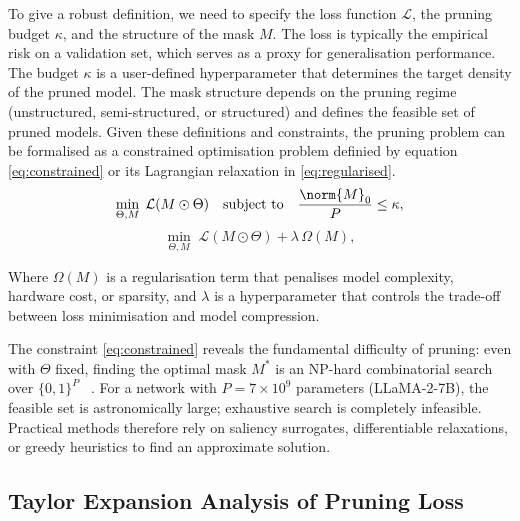 To give a robust definition, we need to specify the loss function $\mathcal{L}$, the pruning budget $\kappa$, and the structure of the mask $M$.  The loss is typically the empirical risk on a validation set, which serves as a proxy for generalisation performance.  The budget $\kappa$ is a user-defined hyperparameter that determines the target density of the pruned model.  The mask structure depends on the pruning regime (unstructured, semi-structured, or structured) and defines the feasible set of pruned models.
Given these definitions and constraints, the pruning problem can be formalised as a constrained optimisation problem definied by equation \eqref{eq:constrained} or its Lagrangian relaxation in \eqref{eq:regularised}.
\begin{equation}
\min_{\Theta, M}\; \mathcal{L}(M \odot \Theta)
\quad
\text{subject to}
\quad
\frac{\norm{M}_0}{P} \le \kappa,
\label{eq:constrained}
\end{equation}
\begin{equation}
\min_{\Theta, M}\; \mathcal{L}(M \odot \Theta) + \lambda\,\Omega(M),
\label{eq:regularised}
\end{equation}

Where $\Omega(M)$ is a regularisation term that penalises model complexity, hardware cost, or sparsity, and $\lambda$ is a hyperparameter that controls the trade-off between loss minimisation and model compression.

\medskip

The constraint \eqref{eq:constrained} reveals the fundamental difficulty of pruning: even with $\Theta$ fixed, finding the optimal mask $M^*$ is an NP-hard combinatorial search over $\{0,1\}^P$ ~\cite{blumensath2008iterative}. For a network with $P = 7 \times 10^9$ parameters (LLaMA-2-7B), the feasible set is astronomically large; exhaustive search is completely infeasible. Practical methods therefore rely on saliency surrogates, differentiable relaxations, or greedy heuristics to find an approximate solution.

\subsection{Taylor Expansion Analysis of Pruning Loss}


